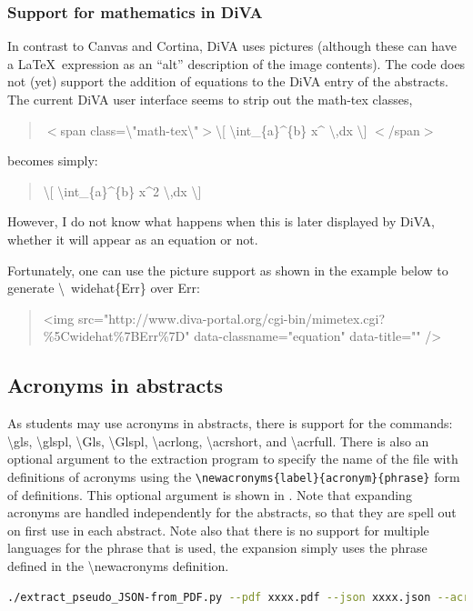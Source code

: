 \subsubsection{Support for mathematics in DiVA}
\label{sec:SupportForMathematicsInDiVA}
In contrast to Canvas and Cortina, DiVA uses pictures (although these can have a \LaTeX~expression as an “alt” description of the image contents).
The code does not (yet) support the addition of equations to the DiVA entry of the abstracts.
The current DiVA user interface seems to strip out the math-tex classes, \ie 

\begin{quote}
$<$span class=\textbackslash"math-tex\textbackslash"$>$\textbackslash [ \textbackslash int\_\{a\}\^{}\{b\} x\^{}  \textbackslash ,dx \textbackslash ] $<$/span$>$
\end{quote}

becomes simply:
\begin{quote}
\textbackslash [ \textbackslash int\_\{a\}\^{}\{b\} x\^{}2  \textbackslash ,dx \textbackslash ]
\end{quote}
\noindent However, I do not know what happens when this is later displayed by DiVA, \ie whether it will appear as an equation or not.

Fortunately, one can use the picture support as shown in the example below to generate \textbackslash\ widehat\{Err\} over Err:
\begin{quote}
<img src="http://www.diva-portal.org/cgi-bin/mimetex.cgi?\%5Cwidehat\%7BErr\%7D" data-classname="equation" data-title="" />
\end{quote}

\subsection{Acronyms in abstracts}
\label{sec:AcronymsInAbstracts}

As students may use acronyms in abstracts, there is support for the commands: \textbackslash gls{}, \textbackslash glspl{}, \textbackslash Gls{}, \textbackslash Glspl{}, \textbackslash acrlong{}, \textbackslash acrshort{}, and \textbackslash acrfull{}. There is also an optional argument to the extraction program to specify the name of the file with definitions of acronyms using the \texttt{\textbackslash newacronyms\{label\}\{acronym\}\{phrase\}} form of definitions. This optional argument is shown in . Note that expanding acronyms are handled independently for the abstracts, so that they are spell out on first use in each abstract. Note also that there is no support for multiple languages for the phrase that is used, \ie the expansion simply uses the phrase defined in the \textbackslash newacronyms definition.
\begin{lstlisting}[language={bash}, caption={Specifying acronyms file}, label=lst:specifyingAcronymsFile]
./extract_pseudo_JSON-from_PDF.py --pdf xxxx.pdf --json xxxx.json --acronyms acronyms.tex
\end{lstlisting}


